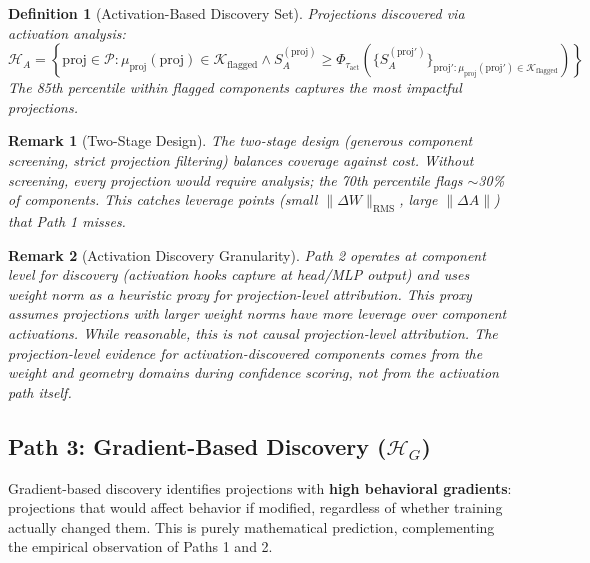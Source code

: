\documentclass[11pt]{article}
\newtheorem{definition}{Definition}[section]
\newtheorem{remark}{Remark}[section]
\begin{document}
\begin{definition}[Activation-Based Discovery Set]
\label{def:activation-based-discovery-set}
Projections discovered via activation analysis:
\begin{equation}
\mathcal{H}_A = \left\{\text{proj} \in \mathcal{P} : \mu_{\text{proj}}(\text{proj}) \in \mathcal{K}_{\text{flagged}} \land S^{(\text{proj})}_A \geq \Phi_{\tau_{\text{act}}}\left(\{S^{(\text{proj}')}_A\}_{\text{proj}': \mu_{\text{proj}}(\text{proj}') \in \mathcal{K}_{\text{flagged}}}\right)\right\}
\end{equation}
The 85th percentile within flagged components captures the most impactful projections.
\end{definition}

\begin{remark}[Two-Stage Design]
\label{rem:two-stage-activation-discovery}
The two-stage design (generous component screening, strict projection filtering) balances coverage against cost. Without screening, every projection would require analysis; the 70th percentile flags $\sim$30\% of components. This catches leverage points (small $\|\Delta W\|_{\text{RMS}}$, large $\|\Delta A\|$) that Path 1 misses.
\end{remark}

\begin{remark}[Activation Discovery Granularity]
\label{rem:activation-discovery-granularity}
Path 2 operates at component level for discovery (activation hooks capture at head/MLP output) and uses weight norm as a heuristic proxy for projection-level attribution. This proxy assumes projections with larger weight norms have more leverage over component activations. While reasonable, this is not causal projection-level attribution. The projection-level evidence for activation-discovered components comes from the weight and geometry domains during confidence scoring, not from the activation path itself.
\end{remark}

\subsection{Path 3: Gradient-Based Discovery ($\mathcal{H}_G$)}
\label{sec:gradient-discovery}

Gradient-based discovery identifies projections with \textbf{high behavioral gradients}: projections that would affect behavior if modified, regardless of whether training actually changed them. This is purely mathematical prediction, complementing the empirical observation of Paths 1 and 2.
\end{document}
